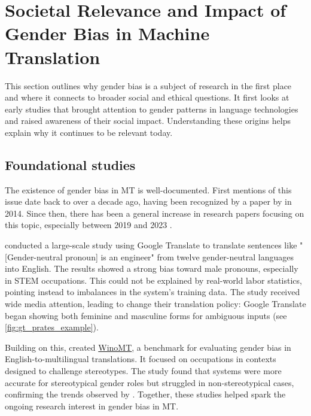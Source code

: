 
\section{Societal Relevance and Impact of Gender Bias in Machine Translation}

This section outlines why gender bias is a subject of research in the first place and where it connects to broader social and ethical questions. It first looks at early studies that brought attention to gender patterns in language technologies and raised awareness of their social impact. Understanding these origins helps explain why it continues to be relevant today.

\subsection{Foundational studies}
The existence of gender bias in MT is well-documented. First mentions of this issue date back to over a decade ago, having been recognized by a paper by \citeauthor{schiebingerScientificResearchMust2014} in 2014. Since then, there has been a general increase in research papers focusing on this topic, especially between 2019 and 2023 \citep{savoldiDecadeGenderBias2025}.

\textbf{\citet{pratesAssessingGenderBias2019}} conducted a large-scale study using Google Translate to translate sentences like "[Gender-neutral pronoun] is an engineer" from twelve gender-neutral languages into English. The results showed a strong bias toward male pronouns, especially in STEM occupations. This could not be explained by real-world labor statistics, pointing instead to imbalances in the system's training data. The study received wide media attention, leading \citeauthor{googleReducingGenderBias2018} to change their translation policy: Google Translate began showing both feminine and masculine forms for ambiguous inputs \citep{googleReducingGenderBias2018} (see \autoref{fig:gt_prates_example}).

Building on this, \textbf{\citet{stanovskyEvaluatingGenderBias2019}} created \href{https://github.com/gabrielStanovsky/mt_gender}{WinoMT}, a benchmark for evaluating gender bias in English-to-multilingual translations. It focused on occupations in contexts designed to challenge stereotypes. The study found that systems were more accurate for stereotypical gender roles but struggled in non-stereotypical cases, confirming the trends observed by \citeauthor{pratesAssessingGenderBias2019}.
Together, these studies helped spark the ongoing research interest in gender bias in MT.

